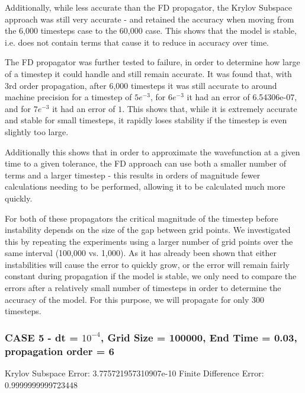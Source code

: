 Additionally, while less accurate than the FD propagator, the Krylov Subspace approach was still very accurate - and retained the accuracy when moving from the 6,000 timesteps case to the 60,000 case. This shows that the model is stable, i.e. does not contain terms that cause it to reduce in accuracy over time.

The FD propagator was further tested to failure, in order to determine how large of a timestep it could handle and still remain accurate. It was found that, with 3rd order propagation, after 6,000 timesteps it was still accurate to around machine precision for a timestep of $5e^{-3}$, for $6e^{-3}$ it had an error of 6.54306e-07, and for $7e^{-3}$ it had an error of $1$. This shows that, while it is extremely accurate and stable for small timesteps, it rapidly loses stability if the timestep is even slightly too large.

Additionally this shows that in order to approximate the wavefunction at a given time to a given tolerance, the FD approach can use both a smaller number of terms and a larger timestep - this results in orders of magnitude fewer calculations needing to be performed, allowing it to be calculated much more quickly.


For both of these propagators the critical magnitude of the timestep before instability depends on the size of the gap between grid points. We investigated this by repeating the experiments using a larger number of grid points over the same interval (100,000 vs. 1,000). As it has already been shown that either instabilities will cause the error to quickly grow, or the error will remain fairly constant during propagation if the model is stable, we only need to compare the errors after a relatively small number of timesteps in order to determine the accuracy of the model. For this purpose, we will propagate for only 300 timesteps.

\subsubsection{CASE 5 - dt = $10^{-4}$, Grid Size = 100000, End Time = 0.03, propagation order = 6}
Krylov Subspace Error: 3.775721957310907e-10\newline
Finite Difference Error: 0.9999999999723448 





